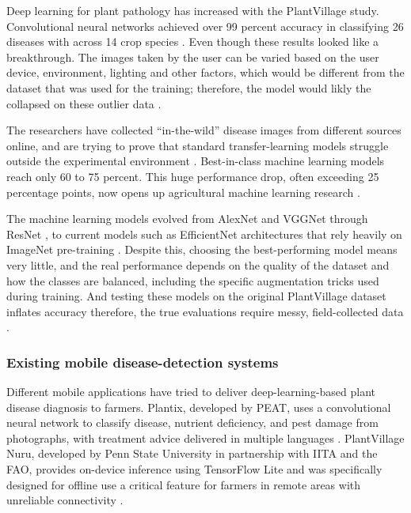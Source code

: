 Deep learning for plant pathology has increased with the PlantVillage study. Convolutional neural networks achieved over 99 percent accuracy in classifying 26 diseases with across 14 crop species \parencite{mohanty2016plantvillage}. Even though these results looked like a breakthrough. The images taken by the user can be varied based on the user device, environment, lighting and other factors, which would be different from the dataset that was used for the training; therefore, the model would likly the collapsed on these outlier data \parencite{singhPlantDoc2020,thakurPlantDiseaseFieldGap2022}.

The researchers have collected ``in-the-wild'' disease images from different sources online, and are trying to prove that standard transfer-learning models struggle outside the experimental environment \parencite{singhPlantDoc2020}.  Best-in-class machine learning models reach only 60 to 75 percent. This huge performance drop, often exceeding 25 percentage points, now opens up agricultural machine learning research \parencite{thakurPlantDiseaseFieldGap2022,li2021plantDiseaseReviewCNN}.

The machine learning models evolved from AlexNet and VGGNet through ResNet \parencite{heResNet2016}, to current models such as EfficientNet architectures that rely heavily on ImageNet pre-training \parencite{saleem2019plantDiseaseML,liu2021plantDiseaseReview}. Despite this, choosing the best-performing model means very little, and the real performance depends on the quality of the dataset and how the classes are balanced, including the specific augmentation tricks used during training. And testing these models on the original PlantVillage dataset inflates accuracy therefore, the true evaluations require messy, field-collected data \parencite{thakurPlantDiseaseFieldGap2022}.


\subsubsection{Existing mobile disease-detection systems}

Different mobile applications have tried to deliver deep-learning-based plant disease diagnosis
to farmers. Plantix, developed by PEAT, uses a convolutional neural network to classify disease,
nutrient deficiency, and pest damage from photographs, with treatment advice delivered in
multiple languages \parencite{petrellaPlantix2023}. PlantVillage Nuru, developed by Penn State
University in partnership with IITA and the FAO, provides on-device inference using TensorFlow
Lite and was specifically designed for offline use a critical feature for farmers in remote
areas with unreliable connectivity \parencite{mrishoPlantVillageNuru2020}.

